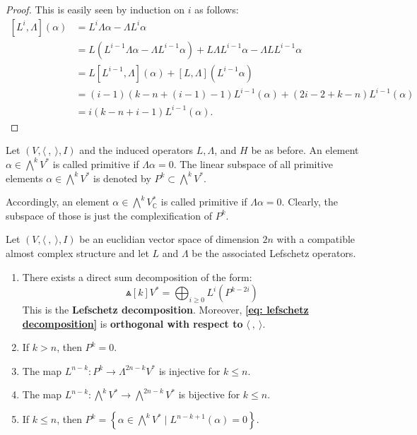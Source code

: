 \begin{proof}
  This is easily seen by induction on $i$ as follows:
$$
\begin{aligned}
{\left[L^i, \Lambda\right](\alpha) } & =L^i \Lambda \alpha-\Lambda L^i \alpha \\
& =L\left(L^{i-1} \Lambda \alpha-\Lambda L^{i-1} \alpha\right)+L \Lambda L^{i-1} \alpha-\Lambda L L^{i-1} \alpha \\
& =L\left[L^{i-1}, \Lambda\right](\alpha)+[L, \Lambda]\left(L^{i-1} \alpha\right) \\
& =(i-1)(k-n+(i-1)-1) L^{i-1}(\alpha)+(2 i-2+k-n) L^{i-1}(\alpha) \\
& =i(k-n+i-1) L^{i-1}(\alpha) .
\end{aligned}
$$
\end{proof}
\begin{definition}
  Let $(V,\langle~,~\rangle, I)$ and the induced operators $L, \Lambda$, and $H$ be as before. An element $\alpha \in \bigwedge^k V^*$ is called primitive if $\Lambda \alpha=0$. The linear subspace of all primitive elements $\alpha \in \bigwedge^k V^*$ is denoted by $P^k \subset \bigwedge^k V^*$.
\end{definition}
Accordingly, an element $\alpha \in \bigwedge^k V_{\mathbb{C}}^*$ is called primitive if $\Lambda \alpha=0$. Clearly, the subspace of those is just the complexification of $P^k$.
\begin{proposition}
  Let $(V,\langle~,~\rangle, I)$ be an euclidian vector space of dimension $2 n$ with a compatible almost complex structure and let $L$ and $\Lambda$ be the associated Lefschetz operators.
\begin{enumerate}[label=\arabic*),font=\upshape]
  \item There exists a direct sum decomposition of the form:
\begin{equation}\label{eq: lefschetz decomposition}
\Wedge[k] V^*=\bigoplus_{i \geq 0} L^i\left(P^{k-2 i}\right)
\end{equation}
This is the \textbf{Lefschetz decomposition}. Moreover, \textbf{\eqref{eq: lefschetz decomposition}} is \textbf{orthogonal with respect to} $\langle~,~\rangle .$
  \item If $k>n$, then $P^k=0$.
  \item The map $L^{n-k}: P^k \rightarrow \Lambda^{2 n-k} V^*$ is injective for $k \leq n$.
  \item The map $L^{n-k}: \bigwedge^k V^* \rightarrow \bigwedge^{2 n-k} V^*$ is bijective for $k \leq n$.
  \item If $k \leq n$, then $P^k=\left\{\alpha \in \bigwedge^k V^* \mid L^{n-k+1} (\alpha)=0\right\}$.
\end{enumerate}
\end{proposition}
